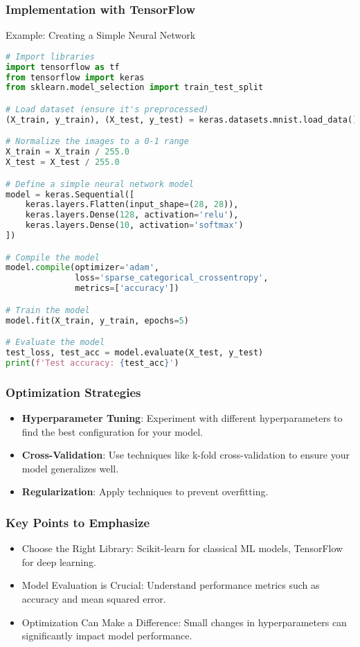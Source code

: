 \documentclass[aspectratio=169]{beamer}
\begin{document}
\begin{frame}[fragile]
    \frametitle{Implementation with TensorFlow}
    \begin{block}{Example: Creating a Simple Neural Network}
    \begin{lstlisting}[language=Python]
# Import libraries
import tensorflow as tf
from tensorflow import keras
from sklearn.model_selection import train_test_split

# Load dataset (ensure it's preprocessed)
(X_train, y_train), (X_test, y_test) = keras.datasets.mnist.load_data()

# Normalize the images to a 0-1 range
X_train = X_train / 255.0
X_test = X_test / 255.0

# Define a simple neural network model
model = keras.Sequential([
    keras.layers.Flatten(input_shape=(28, 28)),
    keras.layers.Dense(128, activation='relu'),
    keras.layers.Dense(10, activation='softmax')
])

# Compile the model
model.compile(optimizer='adam',
              loss='sparse_categorical_crossentropy',
              metrics=['accuracy'])

# Train the model
model.fit(X_train, y_train, epochs=5)

# Evaluate the model
test_loss, test_acc = model.evaluate(X_test, y_test)
print(f'Test accuracy: {test_acc}')
    \end{lstlisting}
    \end{block}
\end{frame}

\begin{frame}
    \frametitle{Optimization Strategies}
    \begin{itemize}
        \item \textbf{Hyperparameter Tuning}: Experiment with different hyperparameters to find the best configuration for your model.
        \item \textbf{Cross-Validation}: Use techniques like k-fold cross-validation to ensure your model generalizes well.
        \item \textbf{Regularization}: Apply techniques to prevent overfitting.
    \end{itemize}
\end{frame}

\begin{frame}
    \frametitle{Key Points to Emphasize}
    \begin{itemize}
        \item Choose the Right Library: Scikit-learn for classical ML models, TensorFlow for deep learning.
        \item Model Evaluation is Crucial: Understand performance metrics such as accuracy and mean squared error.
        \item Optimization Can Make a Difference: Small changes in hyperparameters can significantly impact model performance.
    \end{itemize}
\end{frame}
\end{document}
